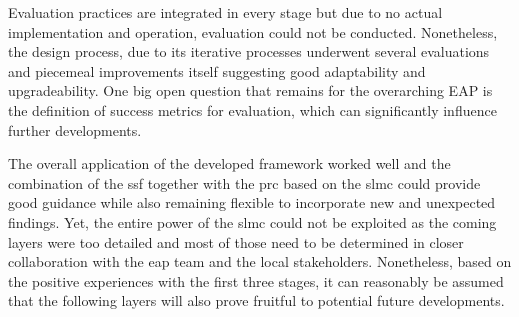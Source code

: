 Evaluation practices are integrated in every stage but due to no actual implementation and operation, evaluation could not be conducted. Nonetheless, the design process, due to its iterative processes underwent several evaluations and piecemeal improvements itself suggesting good adaptability and upgradeability. One big open question that remains for the overarching EAP is the definition of success metrics for evaluation, which can significantly influence further developments.

The overall application of the developed framework worked well and the combination of the \acrshort{ssf} together with the \acrshort{prc} based on the \acrshort{slmc} could provide good guidance while also remaining flexible to incorporate new and unexpected findings. Yet, the entire power of the \acrshort{slmc} could not be exploited as the coming layers were too detailed and most of those need to be determined in closer collaboration with the \acrshort{eap} team and the local stakeholders. Nonetheless, based on the positive experiences with the first three stages, it can reasonably be assumed that the following layers will also prove fruitful to potential future developments.

